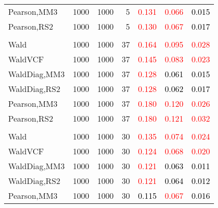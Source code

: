 \documentclass[
]{article}
\begin{document}
\begin{table}[H]
{\begin{tabular}[t]{lrrrrrr}
\hspace{1em}Pearson,MM3 & 1000 & 1000 & 5 & \textcolor{red}{0.131} & \textcolor{red}{0.066} & \textcolor{black}{0.015}\\
\hspace{1em}Pearson,RS2 & 1000 & 1000 & 5 & \textcolor{red}{0.130} & \textcolor{red}{0.067} & \textcolor{black}{0.017}\\
\addlinespace[0.3em]
\multicolumn{7}{l}{\textbf{1F 15V}}\\
\hspace{1em}Wald & 1000 & 1000 & 37 & \textcolor{red}{0.164} & \textcolor{red}{0.095} & \textcolor{red}{0.028}\\
\hspace{1em}WaldVCF & 1000 & 1000 & 37 & \textcolor{red}{0.145} & \textcolor{red}{0.083} & \textcolor{red}{0.023}\\
\hspace{1em}WaldDiag,MM3 & 1000 & 1000 & 37 & \textcolor{red}{0.128} & \textcolor{black}{0.061} & \textcolor{black}{0.015}\\
\hspace{1em}WaldDiag,RS2 & 1000 & 1000 & 37 & \textcolor{red}{0.128} & \textcolor{black}{0.062} & \textcolor{black}{0.017}\\
\hspace{1em}Pearson,MM3 & 1000 & 1000 & 37 & \textcolor{red}{0.180} & \textcolor{red}{0.120} & \textcolor{red}{0.026}\\
\hspace{1em}Pearson,RS2 & 1000 & 1000 & 37 & \textcolor{red}{0.180} & \textcolor{red}{0.121} & \textcolor{red}{0.032}\\
\addlinespace[0.3em]
\multicolumn{7}{l}{\textbf{2F 10V}}\\
\hspace{1em}Wald & 1000 & 1000 & 30 & \textcolor{red}{0.135} & \textcolor{red}{0.074} & \textcolor{red}{0.024}\\
\hspace{1em}WaldVCF & 1000 & 1000 & 30 & \textcolor{red}{0.124} & \textcolor{red}{0.068} & \textcolor{red}{0.020}\\
\hspace{1em}WaldDiag,MM3 & 1000 & 1000 & 30 & \textcolor{red}{0.121} & \textcolor{black}{0.063} & \textcolor{black}{0.011}\\
\hspace{1em}WaldDiag,RS2 & 1000 & 1000 & 30 & \textcolor{red}{0.121} & \textcolor{black}{0.064} & \textcolor{black}{0.012}\\
\hspace{1em}Pearson,MM3 & 1000 & 1000 & 30 & \textcolor{black}{0.115} & \textcolor{red}{0.067} & \textcolor{black}{0.016}\\

\end{tabular}}
\end{table}
\end{document}
